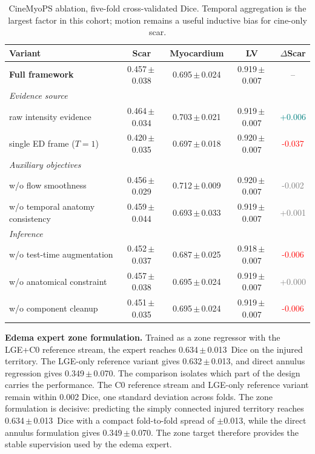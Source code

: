 \documentclass[runningheads]{llncs}
\newcommand{\edemaZoneFull}{0.634\,{\tiny $\pm$\,0.013}}
\newcommand{\edemaZoneNoCz}{0.632\,{\tiny $\pm$\,0.013}}
\newcommand{\edemaZoneDirect}{0.349\,{\tiny $\pm$\,0.070}}
\begin{document}
\begin{table}[t]
\centering
\caption{CineMyoPS ablation, five-fold cross-validated Dice. Temporal aggregation
is the largest factor in this cohort; motion remains a useful inductive bias for
cine-only scar.}
\label{tab:ablation_cine}
\setlength{\tabcolsep}{4pt}
\begin{tabular}{lcccc}
\toprule
Variant & Scar & Myocardium & LV & $\Delta$Scar \\
\midrule
\textbf{Full framework} & 0.457\,{\tiny $\pm$\,0.038} & 0.695\,{\tiny $\pm$\,0.024} & 0.919\,{\tiny $\pm$\,0.007} & -- \\
\midrule
\multicolumn{5}{l}{\textit{Evidence source}} \\
\quad raw intensity evidence & 0.464\,{\tiny $\pm$\,0.034} & 0.703\,{\tiny $\pm$\,0.021} & 0.919\,{\tiny $\pm$\,0.007} & \textcolor{teal}{+0.006} \\
\quad single ED frame ($T{=}1$) & 0.420\,{\tiny $\pm$\,0.035} & 0.697\,{\tiny $\pm$\,0.018} & 0.920\,{\tiny $\pm$\,0.007} & \textcolor{red}{-0.037} \\
\midrule
\multicolumn{5}{l}{\textit{Auxiliary objectives}} \\
\quad w/o flow smoothness & 0.456\,{\tiny $\pm$\,0.029} & 0.712\,{\tiny $\pm$\,0.009} & 0.920\,{\tiny $\pm$\,0.007} & \textcolor{gray}{-0.002} \\
\quad w/o temporal anatomy consistency & 0.459\,{\tiny $\pm$\,0.044} & 0.693\,{\tiny $\pm$\,0.033} & 0.919\,{\tiny $\pm$\,0.007} & \textcolor{gray}{+0.001} \\
\midrule
\multicolumn{5}{l}{\textit{Inference}} \\
\quad w/o test-time augmentation & 0.452\,{\tiny $\pm$\,0.037} & 0.687\,{\tiny $\pm$\,0.025} & 0.918\,{\tiny $\pm$\,0.007} & \textcolor{red}{-0.006} \\
\quad w/o anatomical constraint & 0.457\,{\tiny $\pm$\,0.038} & 0.695\,{\tiny $\pm$\,0.024} & 0.919\,{\tiny $\pm$\,0.007} & \textcolor{gray}{+0.000} \\
\quad w/o component cleanup & 0.451\,{\tiny $\pm$\,0.035} & 0.695\,{\tiny $\pm$\,0.024} & 0.919\,{\tiny $\pm$\,0.007} & \textcolor{red}{-0.006} \\
\bottomrule
\end{tabular}
\end{table}

\noindent\textbf{Edema expert zone formulation.} Trained as a
zone regressor with the LGE+C0 reference stream, the expert reaches
\edemaZoneFull\ Dice on the injured territory. The LGE-only reference variant
gives \edemaZoneNoCz, and direct annulus regression gives
\edemaZoneDirect. The comparison isolates which part of the design carries the
performance. The C0 reference stream and LGE-only reference variant remain
within 0.002 Dice, one standard deviation across folds. The zone formulation is
decisive: predicting the simply connected injured territory reaches
\edemaZoneFull\ Dice with a compact fold-to-fold spread of $\pm$0.013, while
the direct annulus formulation gives \edemaZoneDirect. The zone target therefore
provides the stable supervision used by the edema expert.
\end{document}
